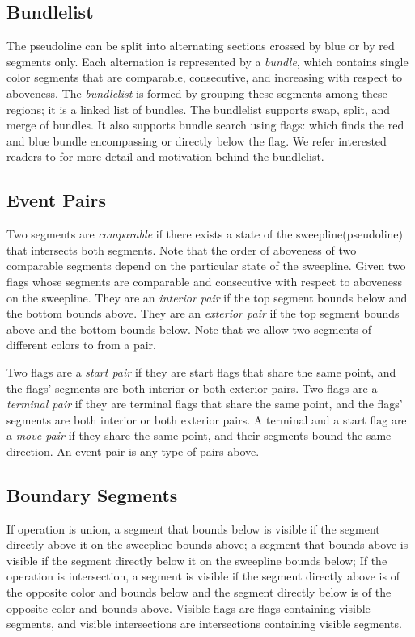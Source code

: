 \documentclass[11pt]{article}
\begin{document}
\subsection{Bundlelist}
The pseudoline can be split into alternating sections crossed by blue or by red segments only.
Each alternation is represented by a \textit{bundle}, which contains single color segments that are comparable, consecutive, and increasing with respect to aboveness.
The \textit{bundlelist} is formed by grouping these segments among these regions; it is a linked list of bundles.
The bundlelist supports swap, split, and merge of bundles.
It also supports bundle search using flags: which finds the red and blue bundle encompassing or directly below the flag.
We refer interested readers to \cite{MS} for more detail and motivation behind the bundlelist.

\subsection{Event Pairs}
Two segments are \textit{comparable} if there exists a state of the sweepline(pseudoline) that intersects both segments.
Note that the order of aboveness of two comparable segments depend on the particular state of the sweepline.
Given two flags whose segments are comparable and consecutive with respect to aboveness on the sweepline.
They are an \textit{interior pair} if the top segment bounds below and the bottom bounds above.
They are an \textit{exterior pair} if the top segment bounds above and the bottom bounds below.
Note that we allow two segments of different colors to from a pair.

Two flags are a \textit{start pair} if they are start flags that share the same point, and the flags' segments are both interior or both exterior pairs.
Two flags are a \textit{terminal pair} if they are terminal flags that share the same point, and the flags' segments are both interior or both exterior pairs.
A terminal and a start flag are a \textit{move pair} if they share the same point, and their segments bound the same direction.
An event pair is any type of pairs above.

\subsection{Boundary Segments}
If operation is union, a segment that bounds below is visible if the segment directly above it on the sweepline bounds above; a segment that bounds above is visible if the segment directly below it on the sweepline bounds below;
If the operation is intersection, a segment is visible if the segment directly above is of the opposite color and bounds below and the segment directly below is of the opposite color and bounds above.
Visible flags are flags containing visible segments, and visible intersections are intersections containing visible segments.
\end{document}
